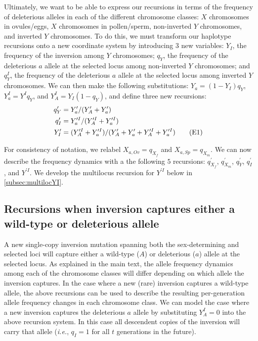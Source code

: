 \documentclass{article}
\newcommand\numberthis{\addtocounter{equation}{1}\tag{\theequation}}
\begin{document}
\begin{appendices}
Ultimately, we want to be able to express our recursions in terms of the frequency of deleterious alleles in each of the different chromosome classes: $X$ chromosomes in ovules/eggs, $X$ chromosomes in pollen/sperm, non-inverted $Y$ chromosomes, and inverted $Y$ chromosomes. To do this, we must transform our haplotype recursions onto a new coordinate system by introducing $3$ new variables: $Y_I$, the frequency of the inversion among $Y$ chromosomes; $q_Y$, the frequency of the deleterious $a$ allele at the selected locus among non-inverted $Y$ chromosomes; and $q^I_Y$, the frequency of the deleterious $a$ allele at the selected locus among inverted $Y$ chromosomes. We can then make the following substitutions: $Y_a = (1 - Y_I)q_Y$, $Y^I_a = Y^I q_Y$, and $Y^I_A = Y_I (1 - q_Y)$, and define three new recursions:
\begin{align*}
	q^{\prime}_Y &= Y^{\prime}_a / (Y^{\prime}_A + Y^{\prime}_a) \\
	q^{\prime}_I &= Y^{\prime I}_a / (Y^{\prime I}_A + Y^{\prime I}_a) \\
	Y^{\prime}_I &= (Y^{\prime I}_A + Y^{\prime I}_a) / (Y^{\prime}_A + Y^{\prime}_a + Y^{\prime I}_A + Y^{\prime I}_a)\numberthis
\end{align*}

\noindent For consistency of notation, we relabel $X_{a,Ov} = q_{X_f}$ and $X_{a,Sp} = q_{X_m}$. We can now describe the frequency dynamics with a the following $5$ recursions: $q^{\prime}_{X_f}$, $q^{\prime}_{X_m}$, $q^{\prime}_Y$, $q^{\prime}_I$, and $Y^{\prime I}$. We develop the multilocus recursion for $Y^{\prime I}$ below in \ref{subsec:multilocYI}.


\subsection{Recursions when inversion captures either a wild-type or deleterious allele}

A new single-copy inversion mutation spanning both the sex-determining and selected loci will capture either a wild-type ($A$) or deleterious ($a$) allele at the selected locus. As explained in the main text, the allele frequency dynamics among each of the chromosome classes will differ depending on which allele the inversion captures. In the case where a new (rare) inversion captures a wild-type allele, the above recursions can be used to describe the resulting per-generation allele frequency changes in each chromosome class. We can model the case where a new inversion captures the deleterious $a$ allele by substituting $Y^I_A = 0$ into the above recursion system. In this case all descendent copies of the inversion will carry that allele ({\itshape i.e.}, $q_I = 1$ for all $t$ generations in the future). 


\end{appendices}
\end{document}
